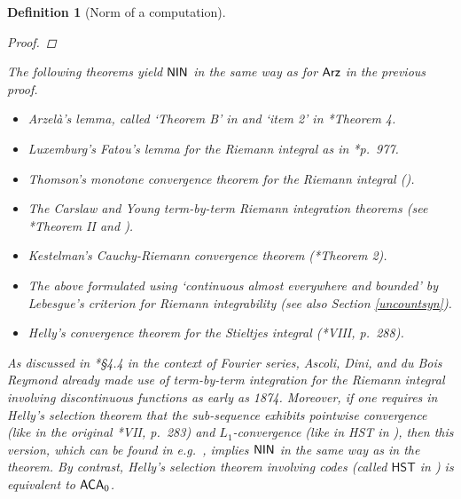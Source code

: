 \documentclass[reqno]{amsart}
\newtheorem{defi}[thm]{Definition}
\def\ACA{\textup{\textsf{ACA}}}
\def\Arz{\textup{\textsf{Arz}}}
\def\NIN{\textup{\textsf{NIN}}}
\numberwithin{equation}{section}
\numberwithin{thm}{section}
\begin{document}
\begin{defi}[Norm of a computation]
\begin{proof}
\end{proof}
\noindent
The following theorems yield $\NIN$ in the same way as for $\Arz$ in the previous proof.
\begin{itemize}
\item Arzel\`a's lemma, called `Theorem B' in \cite{luxeternam} and `item 2' in \cite{gorkoen}*{Theorem 4}.
\item Luxemburg's \emph{Fatou's lemma for the Riemann integral} as in \cite{luxeternam}*{p.\ 977}.
\item Thomson's \emph{monotone convergence theorem for the Riemann integral} (\cite{thomon3}).
\item The Carslaw and Young \emph{term-by-term Riemann integration theorems} (see \cite{koolsla}*{Theorem II} and \cite{young1}).
\item Kestelman's \emph{Cauchy-Riemann convergence theorem} (\cite{kesteisdenbeste}*{Theorem 2}).
\item The above formulated using `continuous almost everywhere and bounded' by Lebesgue's criterion for Riemann integrability (see also Section \ref{uncountsyn}). 
\item Helly's convergence theorem for the Stieltjes integral (\cite{hellyeah}*{VIII, p.\ 288}).
\end{itemize}
As discussed in \cite{kakeye}*{\S4.4} in the context of Fourier series, Ascoli, Dini, and du Bois Reymond already made use of term-by-term integration for the Riemann integral involving discontinuous functions as early as 1874.  
Moreover, if one requires in \emph{Helly's selection theorem} that the sub-sequence exhibits pointwise convergence (like in the original \cite{hellyeah}*{VII, p.\ 283}) \emph{and} $L_{1}$-convergence (like in \textsf{HST} in \cite{kreupel}), then this version, which can be found in e.g.\ \cite{barbu}, implies $\NIN$ in the same way as in the theorem.  By contrast, Helly's selection theorem involving codes (called $\textsf{HST}$ in \cite{kreupel}) is equivalent to $\ACA_{0}$.

\smallskip


\end{defi}
\end{document}
